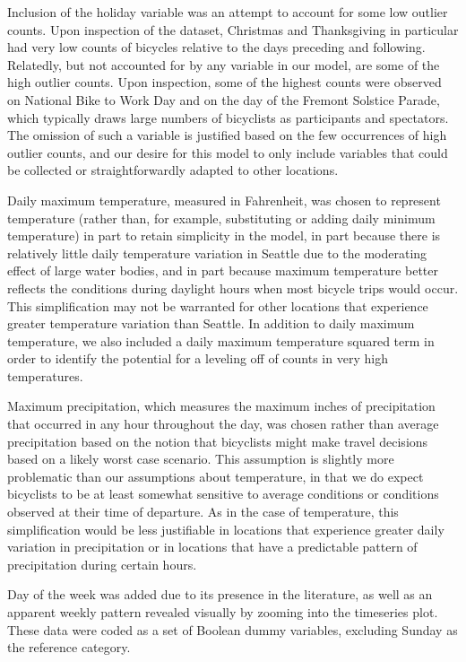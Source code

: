 \documentclass[12pt,letterpaper,article]{memoir}
\begin{document}
Inclusion of the holiday variable was an attempt to account for
some low outlier counts. Upon inspection of the dataset, Christmas and
Thanksgiving in particular had very low counts of bicycles relative to
the days preceding and following. Relatedly, but not accounted for by
any variable in our model, are some of the high outlier counts. Upon
inspection, some of the highest counts were observed on National Bike
to Work Day and on the day of the Fremont Solstice Parade, which
typically draws large numbers of bicyclists as participants and
spectators. The omission of such a variable is justified based on the
few occurrences of high outlier counts, and our desire for this model
to only include variables that could be collected or straightforwardly
adapted to other locations.

Daily maximum temperature, measured in Fahrenheit, was chosen to
represent temperature (rather than, for example, substituting or
adding daily minimum temperature) in part to retain simplicity in the
model, in part because there is relatively little daily temperature
variation in Seattle due to the moderating effect of large water
bodies, and in part because maximum temperature better reflects the
conditions during daylight hours when most bicycle trips would occur.
This simplification may not be warranted for other locations that
experience greater temperature variation than Seattle. In addition to
daily maximum temperature, we also included a daily maximum
temperature squared term in order to identify the potential for a
leveling off of counts in very high temperatures.

Maximum precipitation, which measures the maximum inches of
precipitation that occurred in any hour throughout the day, was chosen
rather than average precipitation based on the notion that bicyclists
might make travel decisions based on a likely worst case scenario.
This assumption is slightly more problematic than our assumptions
about temperature, in that we do expect bicyclists to be at least
somewhat sensitive to average conditions or conditions observed at
their time of departure. As in the case of temperature, this
simplification would be less justifiable in locations that experience
greater daily variation in precipitation or in locations that have a
predictable pattern of precipitation during certain hours.

Day of the week was added due to its presence in the literature, as
well as an apparent weekly pattern revealed visually by zooming into
the timeseries plot. These data were coded as a set of Boolean dummy
variables, excluding Sunday as the reference category.
\end{document}
